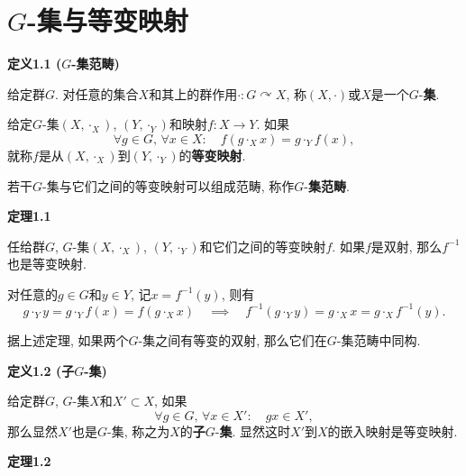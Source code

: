 \documentclass[UTF8]{ctexart}
\begin{document}
\setlength{\abovedisplayskip}{1pt}
\setlength{\belowdisplayskip}{1pt}

\section{\texorpdfstring{$G$}{G}-集与等变映射}

\hypertarget{sec:定义1.1}{}
\noindent\textbf{定义1.1 ($G$-集范畴)}

给定群$G$. 对任意的集合$X$和其上的群作用$\cdot:G\curvearrowright X$,
称$(X,\cdot)$或$X$是一个$G$-\textbf{集}.

给定$G$-集$(X,\cdot_X)$, $(Y,\cdot_Y)$和映射$f:X\to Y$. 如果
\[
    \forall g\in G,\,\forall x\in X:\quad f(g\cdot_X x)=g\cdot_Y f(x),
\]
就称$f$是从$(X,\cdot_X)$到$(Y,\cdot_Y)$的\textbf{等变映射}.

若干$G$-集与它们之间的等变映射可以组成范畴, 称作$G$-\textbf{集范畴}.


\vspace{10pt}

\hypertarget{sec:定理1.1}{}
\noindent\textbf{定理1.1}

任给群$G$, $G$-集$(X,\cdot_X)$, $(Y,\cdot_Y)$和它们之间的等变映射$f$.
如果$f$是双射, 那么$f^{-1}$也是等变映射.


对任意的$g\in G$和$y\in Y$, 记$x=f^{-1}(y)$, 则有
\begin{equation*}
    g\cdot_Y y=g\cdot_Y f(x)=f(g\cdot_X x)\quad\implies\quad
    f^{-1}(g\cdot_Y y)=g\cdot_X x=g\cdot_X f^{-1}(y).
\tag*{\qedsymbol}\end{equation*}

\vspace{10pt}

据上述定理, 如果两个$G$-集之间有等变的双射, 那么它们在$G$-集范畴中同构.

\vspace{15pt}

\hypertarget{sec:定义1.2}{}
\noindent\textbf{定义1.2 (子$G$-集)}

给定群$G$, $G$-集$X$和$X'\subset X$, 如果
\[
    \forall g\in G,\,\forall x\in X':\quad gx\in X',
\]
那么显然$X'$也是$G$-集, 称之为$X$的\textbf{子}$G$-\textbf{集}.
显然这时$X'$到$X$的嵌入映射是等变映射.

\vspace{10pt}

\hypertarget{sec:定理1.2}{}
\noindent\textbf{定理1.2}
\end{document}
